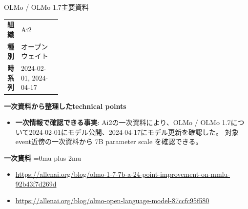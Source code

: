 \Needspace{0.38\textheight}
\begin{technicalnote}{OLMo / OLMo 1.7}{主要資料}
\begingroup
\begin{tabularx}{\linewidth}{@{}>{\bfseries}p{0.22\linewidth}X@{}}
組織 & Ai2 \\
種別 & オープンウェイト \\
時系列 & 2024-02-01, 2024-04-17 \\
\end{tabularx}
\smallskip
\begin{minipage}{\linewidth}
{\bfseries 一次資料から整理したtechnical points}
\begin{itemize}[leftmargin=1.5em,itemsep=0.35em]
\item \textbf{一次情報で確認できる事実}: Ai2の一次資料により、OLMo / OLMo 1.7について2024-02-01にモデル公開、2024-04-17にモデル更新を確認した。 対象event近傍の一次資料から 7B parameter scale を確認できる。
\end{itemize}
\begin{minipage}{\linewidth}
\begin{samepage}
{\bfseries 一次資料}
\begingroup\sloppy
\Urlmuskip=0mu plus 2mu\relax
\begin{itemize}[leftmargin=1.5em,itemsep=0.25em]
\item {\scriptsize\url{https://allenai.org/blog/olmo-1-7-7b-a-24-point-improvement-on-mmlu-92b43f7d269d}}
\item {\scriptsize\url{https://allenai.org/blog/olmo-open-language-model-87ccfc95f580}}
\end{itemize}
\endgroup
\end{samepage}
\end{minipage}
\end{minipage}
\endgroup
\end{technicalnote}
\medskip

